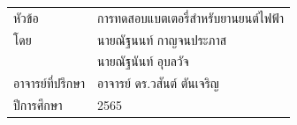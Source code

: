 \setcounter{page}{1}
\frontmatter
\noindent\begin{tabularx}{\linewidth}{@{}l@{\qquad}X@{}}
	หัวข้อ\@typeofwritingThai					& การทดสอบแบตเตอรี่สำหรับยานยนต์ไฟฟ้า\\
	โดย										& นายณัฐนนท์ กาญจนประภาส\\ & นายณัฐนันท์ อุบลวัจ\\
	อาจารย์ที่ปรึกษา									& อาจารย์ ดร.วสันต์ ตันเจริญ\\
	ปีการศึกษา									& 2565
\end{tabularx}

\cleardoublepage
\newpage



%



